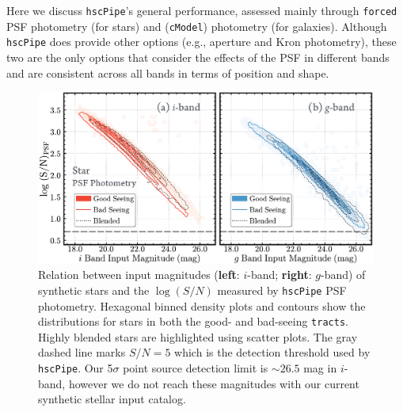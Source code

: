 \documentclass[useamsfonts]{pasj01}
\def\hscpipe{\texttt{hscPipe}}
\def\cmodel{\texttt{cModel}}
\def\forced{\texttt{forced}}
\def\tracts{\texttt{tracts}}
\begin{document}
    Here we discuss \hscpipe{}'s general performance, assessed mainly through \forced{} 
    PSF photometry (for stars) and (\cmodel{}) photometry (for galaxies).
    Although \hscpipe{} does provide other options (e.g., aperture and Kron photometry),
    these two are the only options that consider the effects of the PSF in different 
    bands and are consistent across all bands in terms of position and shape. 
    

\begin{figure}
    \begin{center}
        \includegraphics[width=\textwidth]{fig/synpipe_psf_sn}
    \end{center}
    \caption{
        Relation between input magnitudes (\textbf{left}: $i$-band; \textbf{right}:
        $g$-band) of synthetic stars and the $\log (S/N)$ measured by \hscpipe{} PSF
        photometry.
        Hexagonal binned density plots and contours show the distributions for
        stars in both the good- and bad-seeing \tracts{}. 
        Highly blended stars are highlighted using scatter plots.
        The gray dashed line marks $S/N = 5$ which is the detection threshold used 
        by \hscpipe{}.  
        Our 5$\sigma$ point source detection limit is ${\sim}26.5$ mag in $i$-band,
        however we do not reach these magnitudes with our current synthetic stellar 
        input catalog.
        }
    \label{fig:star_sn}
\end{figure}
\end{document}
